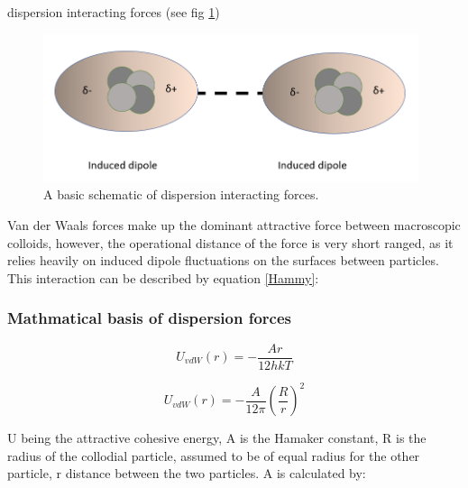dispersion interacting forces (see fig \ref{fig:disp})

\begin{figure}[h]     %
        \begin{center}
          \includegraphics[width=110mm]{chapter1/London.PNG}
\end{center}
\caption{A basic schematic of dispersion interacting forces.}
\label{fig:disp}                 %
\end{figure}

Van der Waals forces make up the dominant attractive force between macroscopic colloids, however, the operational distance of the force is very short ranged, as it relies heavily on induced dipole fluctuations on the surfaces between particles. \cite{colloid_review1} This interaction can be described by equation \ref{Hammy}:  

\subsubsection{Mathmatical basis of dispersion forces} %

\begin{equation} %
U_{vdW} (r) = - \frac{A r}{12hkT}
\label{Hammy}
\end{equation}

\begin{equation}
U_{vdW} (r) = - \frac{A}{12\pi} \left( \frac{R}{r}\right)^2
\label{VDWeqn}
\end{equation}

U being the attractive cohesive energy, A is the Hamaker constant, R is the radius of the collodial particle, assumed to be of equal radius for the other particle, r distance between the two particles.\cite{?} A is calculated by:

